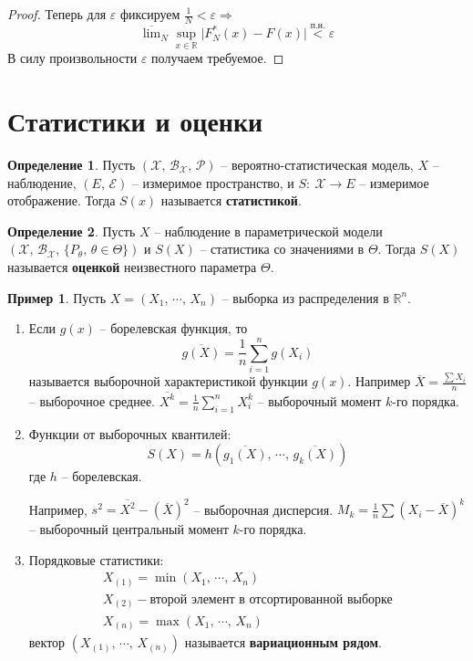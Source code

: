\documentclass[a4paper,12pt]{article}
\theoremstyle{plain}
\theoremstyle{definition}
\newtheorem{definition}{Определение}[section]
\newtheorem*{example}{Пример}
\theoremstyle{remark}
\begin{document}
\begin{proof}
  Теперь для $\varepsilon$ фиксируем $\frac{1}{N} < \varepsilon \Rightarrow$
  \[
    \overline{\lim}_N \sup_{x \in \mathbb{R}}\vert F_N^*(x) - F(x)\vert \overset{\text{п.н.}}{<} \varepsilon
  \]
  В силу произвольности $\varepsilon$ получаем требуемое.
\end{proof}

\section{Статистики и оценки}
\begin{definition}
  Пусть $(\mathcal{X},\, \mathcal{B}_\mathcal{X},\, \mathcal{P})$ -- вероятно-статистическая модель, $X$ -- наблюдение, $(E,\,\mathcal{E})$ -- измеримое пространство, и $S :\: \mathcal{X} \to E$ -- измеримое отображение. Тогда $S(x)$ называется \textbf{статистикой}.
\end{definition}

\begin{definition}
  Пусть $X$ -- наблюдение в параметрической модели $(\mathcal{X},\, \mathcal{B}_\mathcal{X},\, \{P_\theta,\, \theta \in \Theta\})$ и $S(X)$ -- статистика со значениями в $\Theta$. Тогда $S(X)$ называется \textbf{оценкой} неизвестного параметра $\Theta$.
\end{definition}

\begin{example}
  Пусть $X = (X_1,\,\cdots,\,X_n)$ -- выборка из распределения в $\mathbb{R}^n$. 
  \begin{enumerate}
    \item Если $g(x)$ -- борелевская функция, то
    \[
      \overline{g(X)} = \frac{1}{n}\sum_{i = 1}^n g(X_i)
    \]
    называется выборочной характеристикой функции $g(x)$. Например $\overline{X} = \frac{\sum X_i}{n}$ -- выборочное среднее. $\overline{X^k} = \frac{1}{n}\sum_{i = 1}^n X_i^k$ -- выборочный момент $k$-го порядка.
    \item Функции от выборочных квантилей:
    \[
      S(X) = h(\overline{g_1(X)},\,\cdots,\,\overline{g_k(X)})
    \]
    где $h$ -- борелевская.

    Например, $s^2 = \overline{X^2} - (\overline{X})^2$ -- выборочная дисперсия. $M_k = \frac{1}{n}\sum(X_i - \overline{X})^k$ -- выборочный центральный момент $k$-го порядка.
    \item Порядковые статистики:
    \begin{align*}
      X_{(1)} = \min(X_1,\,\cdots,\,X_n)\\
      X_{(2)} - \text{второй элемент в отсортированной выборке}\\
      X_{(n)} = \max(X_1,\,\cdots,\,X_n)
    \end{align*}
    вектор $(X_{(1)},\,\cdots,\,X_{(n)})$ называется \textbf{вариационным рядом}.
  \end{enumerate}
\end{example}
\end{document}
